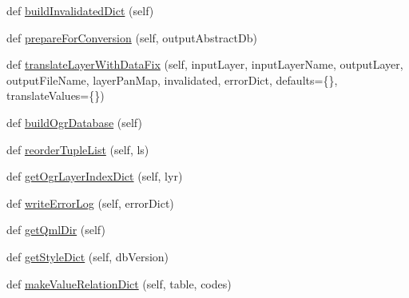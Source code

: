 \begin{DoxyCompactItemize}
\item 
def \mbox{\hyperlink{class_dsg_tools_1_1_factories_1_1_db_factory_1_1abstract_db_1_1_abstract_db_a544337a6752eae3f22d21610f4ce1dab}{build\+Invalidated\+Dict}} (self)
\item 
def \mbox{\hyperlink{class_dsg_tools_1_1_factories_1_1_db_factory_1_1abstract_db_1_1_abstract_db_aed5b42455a633ecafc823b7f8591cce7}{prepare\+For\+Conversion}} (self, output\+Abstract\+Db)
\item 
def \mbox{\hyperlink{class_dsg_tools_1_1_factories_1_1_db_factory_1_1abstract_db_1_1_abstract_db_a170002788b3252443f4458e055207825}{translate\+Layer\+With\+Data\+Fix}} (self, input\+Layer, input\+Layer\+Name, output\+Layer, output\+File\+Name, layer\+Pan\+Map, invalidated, error\+Dict, defaults=\{\}, translate\+Values=\{\})
\item 
def \mbox{\hyperlink{class_dsg_tools_1_1_factories_1_1_db_factory_1_1abstract_db_1_1_abstract_db_ac38d68fbcc40e5bcc3fd95aec02ce76d}{build\+Ogr\+Database}} (self)
\item 
def \mbox{\hyperlink{class_dsg_tools_1_1_factories_1_1_db_factory_1_1abstract_db_1_1_abstract_db_acd6bf5e448b6666716bcd76de48995ca}{reorder\+Tuple\+List}} (self, ls)
\item 
def \mbox{\hyperlink{class_dsg_tools_1_1_factories_1_1_db_factory_1_1abstract_db_1_1_abstract_db_a3c0fb949623a1edca9ee934c1643b157}{get\+Ogr\+Layer\+Index\+Dict}} (self, lyr)
\item 
def \mbox{\hyperlink{class_dsg_tools_1_1_factories_1_1_db_factory_1_1abstract_db_1_1_abstract_db_ab88ed94d88287d77c62271610d411494}{write\+Error\+Log}} (self, error\+Dict)
\item 
def \mbox{\hyperlink{class_dsg_tools_1_1_factories_1_1_db_factory_1_1abstract_db_1_1_abstract_db_a8dcc86de5ba1fb426c1e022b0be14826}{get\+Qml\+Dir}} (self)
\item 
def \mbox{\hyperlink{class_dsg_tools_1_1_factories_1_1_db_factory_1_1abstract_db_1_1_abstract_db_acfeaf4a5658a8ec9aa3adcf74f8a2ab9}{get\+Style\+Dict}} (self, db\+Version)
\item 
def \mbox{\hyperlink{class_dsg_tools_1_1_factories_1_1_db_factory_1_1abstract_db_1_1_abstract_db_aaa59942db1d440d487cb90893e12f921}{make\+Value\+Relation\+Dict}} (self, table, codes)
\item 
\mbox{\label{class_dsg_tools_1_1_factories_1_1_db_factory_1_1abstract_db_1_1_abstract_db_aa9825499311b587c49987c0700d09445}} 

\end{DoxyCompactItemize}
